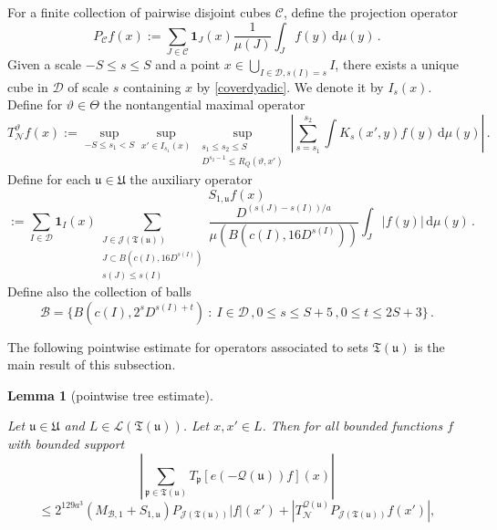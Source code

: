 \documentclass[10pt,a4paper]{article}
\theoremstyle{plain}
\newtheorem{lemma}[theorem]{Lemma}
\theoremstyle{definition}
\numberwithin{equation}{subsection}
\newcommand{\fp}{{\mathfrak p}}
\newcommand{\fu}{{\mathfrak u}}
\newcommand{\fU}{{\mathfrak U}}
\newcommand{\fT}{{\mathfrak T}}
\newcommand{\mfa}{{\vartheta}}
\newcommand{\Mf}{{\Theta}}
\newcommand{\fcc}{{\mathcal{Q}}}
\newcommand{\lean}[1]{}
\newcommand{\uses}[1]{}
\newcommand{\leanok}{}
\begin{document}
For a finite collection of pairwise disjoint cubes $\mathcal{C}$, define the projection operator
$$
    P_{\mathcal{C}}f(x) :=\sum_{J\in\mathcal{C}}\mathbf{1}_J(x) \frac{1}{\mu(J)}\int_J f(y) \, \mathrm{d}\mu(y)\,.
$$
Given a scale $-S \le s\le S$ and a point $x \in \bigcup_{I\in \mathcal{D}, s(I) = s} I$, there exists a unique cube in $\mathcal{D}$ of scale $s$ containing $x$ by \eqref{coverdyadic}. We denote it by $I_s(x)$. Define for $\mfa \in \Mf$ the nontangential maximal operator
\begin{equation}
    \label{eq-TN-def}
    T_{\mathcal{N}}^\mfa f(x) := \sup_{-S \le s_1 < S} \sup_{x' \in I_{s_1}(x)} \sup_{\substack{s_1 \le s_2 \le S\\ D^{s_2-1} \le R_Q(\mfa, x')}} \left| \sum_{s = s_1}^{s_2} \int K_s(x',y) f(y) \, \mathrm{d}\mu(y) \right|\,.
\end{equation}
Define for each $\fu \in \fU$ the auxiliary operator
$$
    S_{1,\fu}f(x)
$$
\begin{equation}
    \label{eq-def-S-op}
    :=\sum_{I\in\mathcal{D}} \mathbf{1}_{I}(x) \sum_{\substack{J\in \mathcal{J}(\fT(\fu))\\
    J\subset B(c(I), 16 D^{s(I)})\\ s(J) \le s(I)}} \frac{D^{(s(J) - s(I))/a}}{\mu(B(c(I), 16D^{s(I)}))}\int_J |f(y)| \, \mathrm{d}\mu(y)\,.
\end{equation}
Define also the collection of balls
$$
    \mathcal{B} = \{B(c(I), 2^s D^{s(I)+t}) \ : \ I \in \mathcal{D}\,, 0 \le s \le S + 5\,, 0 \le t \le 2S+3\}\,.
$$

The following pointwise estimate for operators associated to sets $\fT(\fu)$ is the main result of this subsection.

\begin{lemma}[pointwise tree estimate]
    \label{pointwise-tree-estimate}
    \leanok
    \lean{TileStructure.Forest.pointwise_tree_estimate}
    \uses{first-tree-pointwise,second-tree-pointwise,third-tree-pointwise}
    Let $\fu \in \fU$ and $L \in \mathcal{L}(\fT(\fu))$. Let $x, x' \in L$.
    Then for all bounded functions $f$ with bounded support
    $$
        \left|\sum_{\fp \in \fT(\fu)} T_{\fp}[ e(-\fcc(\fu))f](x)\right|
    $$
    \begin{equation}
        \label{eq-LJ-ptwise}
        \leq 2^{129a^3}(M_{\mathcal{B},1}+S_{1,\fu})P_{\mathcal{J}(\fT(\fu))}|f|(x')+|T_{\mathcal{N}}^{\fcc(\fu)} P_{\mathcal{J}(\fT(\fu))}f(x')|,
    \end{equation}
\end{lemma}
\end{document}
